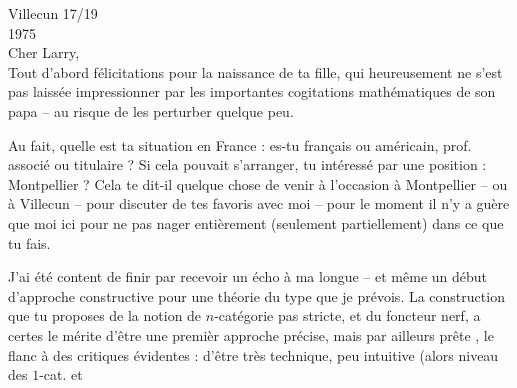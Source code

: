 \hfill Villecun 17/19 \\
\hfill 1975\\
Cher Larry,\\

Tout d'abord félicitations pour la naissance de ta fille, qui heureusement ne s'est pas laissée impressionner par les importantes cogitations mathématiques de son papa -- au risque de les perturber quelque peu.

Au fait, quelle est ta situation en France : es-tu français ou américain, prof. associé ou titulaire ? Si cela pouvait s'arranger,  tu intéressé par une position : Montpellier ? Cela te dit-il quelque chose de venir à l'occasion à Montpellier -- ou à Villecun -- pour discuter de tes favoris avec moi -- pour le moment il n'y a guère que moi ici pour ne pas nager entièrement (seulement partiellement) dans ce que tu fais.

J'ai été content de finir par recevoir un écho à ma longue  -- et même un début d'approche constructive pour  une théorie du type que je prévois. La construction que tu proposes de la notion de $n$-catégorie pas stricte, et du foncteur nerf, a certes le mérite  d'être une premièr approche précise, mais par ailleurs prête  , le flanc à des critiques évidentes : d'être très technique, peu intuitive (alors  niveau des $1$-cat. et
